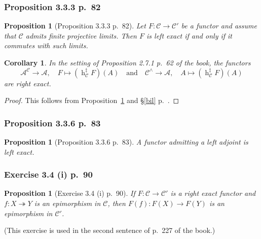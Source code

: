 \documentclass[12pt]{article}
\newtheorem{prop}[thm]{Proposition}
\newtheorem{cor}[thm]{Corollary}
\theoremstyle{remark}
\theoremstyle{definition}
\newcommand{\oo}{\operatorname}
\newcommand{\A}{\mathcal A}
\newcommand{\C}{\mathcal C}
\newcommand{\epi}{\twoheadrightarrow}
\begin{document}
\subsubsection{Proposition 3.3.3 p.~82}

\begin{prop}[Proposition 3.3.3 p.~82]\label{333}
Let $F:\C\to\C'$ be a functor and assume that $\C$ admits finite projective limits. Then $F$ is left exact if and only if it commutes with such limits.
\end{prop}

\begin{cor}\label{bre}
In the setting of Proposition 2.7.1 p.~62 of the book, the functors
$$
\A^\C\to\A,\quad F\mapsto(\oo h_\C^\ddagger F)(A)\quad\text{and}\quad
\C^\wedge\to\A,\quad A\mapsto(\oo h_\C^\ddagger F)(A)
$$ 
are right exact. 
\end{cor}

\begin{proof}
This follows from Proposition~\ref{333} and \S\ref{bil} p.~\pageref{bil}.
\end{proof}

\subsubsection{Proposition 3.3.6 p.~83}

\begin{prop}[Proposition 3.3.6 p.~83]\label{336}
A functor admitting a left adjoint is left exact.
\end{prop}

\subsubsection{Exercise 3.4 (i) p.~90}

\begin{prop}[Exercise 3.4 (i) p.~90]\label{34i}
If $F:\C\to\C'$ is a right exact functor and $f:X\epi Y$ is an epimorphism in $\C$, then $F(f):F(X)\to F(Y)$ is an epimorphism in $\C'$.
\end{prop}

(This exercise is used in the second sentence of p.~227 of the book.)
\end{document}
